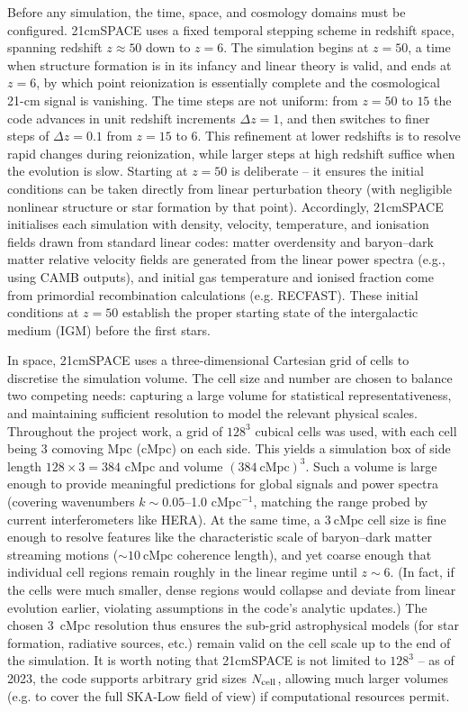 \documentclass[floats,floatfix,showpacs,amssymb,prd,superscriptaddress,nofootinbib]{revtex4-2} %
\begin{document}
Before any simulation, the time, space, and cosmology domains must be configured. 21cmSPACE uses a fixed temporal stepping scheme in redshift space, spanning redshift $z\approx50$ down to $z=6$. The simulation begins at $z=50$, a time when structure formation is in its infancy and linear theory is valid, and ends at $z=6$, by which point reionization is essentially complete and the cosmological 21-cm signal is vanishing. The time steps are not uniform: from $z=50$ to $15$ the code advances in unit redshift increments $\Delta z=1$, and then switches to finer steps of $\Delta z=0.1$ from $z=15$ to $6$. This refinement at lower redshifts is to resolve rapid changes during reionization, while larger steps at high redshift suffice when the evolution is slow. Starting at $z=50$ is deliberate – it ensures the initial conditions can be taken directly from linear perturbation theory (with negligible nonlinear structure or star formation by that point). Accordingly, 21cmSPACE initialises each simulation with density, velocity, temperature, and ionisation fields drawn from standard linear codes: matter overdensity and baryon–dark matter relative velocity fields are generated from the linear power spectra (e.g., using CAMB outputs), and initial gas temperature and ionised fraction come from primordial recombination calculations (e.g. RECFAST). These initial conditions at $z=50$ establish the proper starting state of the intergalactic medium (IGM) before the first stars.

In space, 21cmSPACE uses a three-dimensional Cartesian grid of cells to discretise the simulation volume. The cell size and number are chosen to balance two competing needs: capturing a large volume for statistical representativeness, and maintaining sufficient resolution to model the relevant physical scales. Throughout the project work, a grid of $128^3$ cubical cells was used, with each cell being 3 comoving Mpc (cMpc) on each side. This yields a simulation box of side length $128\times3 = 384$ cMpc and volume $(384~\text{cMpc})^3$. Such a volume is large enough to provide meaningful predictions for global signals and power spectra (covering wavenumbers $k \sim 0.05$–1.0 cMpc$^{-1}$, matching the range probed by current interferometers like HERA). At the same time, a $3~\text{cMpc}$ cell size is fine enough to resolve features like the characteristic scale of baryon–dark matter streaming motions ($\sim 10~\text{cMpc}$ coherence length), and yet coarse enough that individual cell regions remain roughly in the linear regime until $z\sim6$. (In fact, if the cells were much smaller, dense regions would collapse and deviate from linear evolution earlier, violating assumptions in the code’s analytic updates.) The chosen 3 cMpc resolution thus ensures the sub-grid astrophysical models (for star formation, radiative sources, etc.) remain valid on the cell scale up to the end of the simulation. It is worth noting that 21cmSPACE is not limited to $128^3$ – as of 2023, the code supports arbitrary grid sizes $N_{\rm cell}$, allowing much larger volumes (e.g. to cover the full SKA-Low field of view) if computational resources permit.
\end{document}

